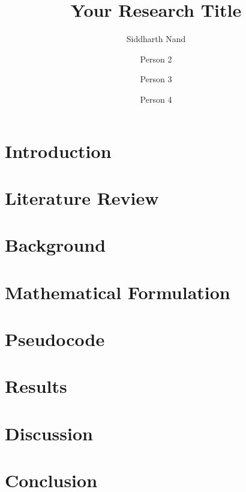 \documentclass[12pt]{article}
\title{Your Research Title}
\author{
	Siddharth Nand \and
	Person 2 \and
	Person 3 \and
	Person 4
}
\date{}
\begin{document}
\maketitle

\begin{abstract}
    
\end{abstract}

\section{Introduction}


\section{Literature Review}


\section{Background}


\section{Mathematical Formulation}


\section{Pseudocode}


\section{Results}


\section{Discussion}


\section{Conclusion}


%
%
\end{document}
